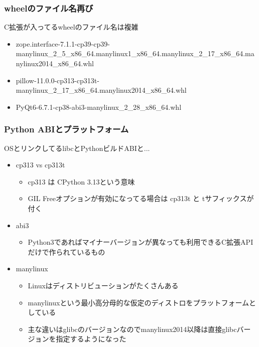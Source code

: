 \documentclass[aspectratio=169]{beamer}
\begin{document}
\begin{frame}
\frametitle{wheelのファイル名再び}
C拡張が入ってるwheelのファイル名は複雑
\begin{itemize}
\item zope.interface-7.1.1-cp39-cp39-manylinux\_2\_5\_x86\_64.manylinux1\_x86\_64.manylinux\_2\_17\_x86\_64.manylinux2014\_x86\_64.whl 
\item pillow-11.0.0-cp313-cp313t-manylinux\_2\_17\_x86\_64.manylinux2014\_x86\_64.whl 
\item PyQt6-6.7.1-cp38-abi3-manylinux\_2\_28\_x86\_64.whl
\end{itemize}
\end{frame}

\begin{frame}
\frametitle{Python ABIとプラットフォーム}
OSとリンクしてるlibcとPythonビルドABIと...
\begin{itemize}
\item cp313 vs cp313t
\begin{itemize}
\item cp313 は CPython 3.13という意味
\item GIL Freeオプションが有効になってる場合は cp313t と tサフィックスが付く
\end{itemize}
\item abi3
\begin{itemize}
\item Python3であればマイナーバージョンが異なっても利用できるC拡張APIだけで作られているもの
\end{itemize}
\item manylinux
\begin{itemize}
\item Linuxはディストリビューションがたくさんある
\item manylinuxという最小高分母的な仮定のディストロをプラットフォームとしている
\item 主な違いはglibcのバージョンなのでmanylinux2014以降は直接glibcバージョンを指定するようになった
\end{itemize}
\end{itemize}
\end{frame}
\end{document}
